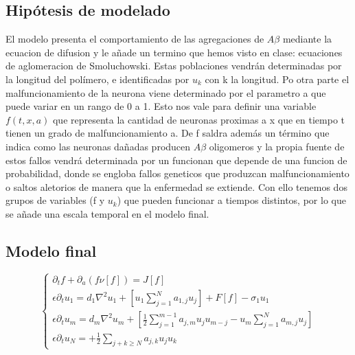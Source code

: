 \documentclass[1p]{elsarticle}
\begin{document}
\subsection{Hipótesis de modelado} El modelo presenta el comportamiento de las agregaciones de $A\beta$ mediante la ecuacion de difusion y le añade un termino que hemos visto en clase: ecuaciones de aglomeracion de Smoluchowski. Estas poblaciones vendrán determinadas por la longitud del polímero, e identificadas por $u_k$ con k la longitud.
Po otra parte el malfuncionamiento de la neurona viene determinado por el parametro a que puede variar en un rango de 0 a 1. Esto nos vale para definir una variable $f(t,x,a)$ que representa la cantidad de neuronas proximas a x que en tiempo t tienen un grado de malfuncionamiento a.
De f saldra además un término que indica como las neuronas dañadas producen $A\beta$ oligomeros y la propia fuente de estos fallos vendrá determinada por un funcionan que depende de una funcion de probabilidad, donde se engloba fallos geneticos que produzcan malfuncionamiento o saltos aletorios de manera que la enfermedad se extiende. 
Con ello tenemos dos grupos de variables (f y $u_k$) que pueden funcionar a tiempos distintos, por lo que se añade una escala temporal en el modelo final.

\subsection{Modelo final}

	\begin{equation}
	\left\lbrace
	\begin{array}{ll}
	\partial_tf+\partial_a(f\nu[f])=J[f] \\
	\epsilon\partial_tu_1=d_1\nabla^2u_1+[u_1\sum_{j=1}^{N}a_{1,j}u_j]+F[f]-\sigma_1u_1\\
	\epsilon\partial_tu_m=d_m\nabla^2u_m+[\frac{1}{2}\sum_{j=1}^{m-1}a_{j,m}u_ju_{m-j}-u_m\sum_{j=1}^{N}a_{m,j}u_j]  \\
	\epsilon\partial_tu_N=+\frac{1}{2}\sum_{j+k\geq N}a_{j,k}u_ju_k
	\end{array}
	\right.
	\end{equation}
\end{document}
